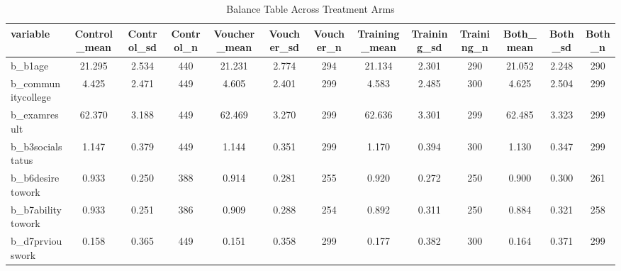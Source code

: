\begin{table}[htbp]
\centering
\caption{Balance Table Across Treatment Arms}
\label{tab:balance}
\begin{tabular}{lcccccccccccc}
\hline\hline
variable & Control\_mean & Control\_sd & Control\_n & Voucher\_mean & Voucher\_sd & Voucher\_n & Training\_mean & Training\_sd & Training\_n & Both\_mean & Both\_sd & Both\_n \\
\hline
b\_b1age & 21.295 & 2.534 & 440 & 21.231 & 2.774 & 294 & 21.134 & 2.301 & 290 & 21.052 & 2.248 & 290 \\
b\_communitycollege & 4.425 & 2.471 & 449 & 4.605 & 2.401 & 299 & 4.583 & 2.485 & 300 & 4.625 & 2.504 & 299 \\
b\_examresult & 62.370 & 3.188 & 449 & 62.469 & 3.270 & 299 & 62.636 & 3.301 & 299 & 62.485 & 3.323 & 299 \\
b\_b3socialstatus & 1.147 & 0.379 & 449 & 1.144 & 0.351 & 299 & 1.170 & 0.394 & 300 & 1.130 & 0.347 & 299 \\
b\_b6desiretowork & 0.933 & 0.250 & 388 & 0.914 & 0.281 & 255 & 0.920 & 0.272 & 250 & 0.900 & 0.300 & 261 \\
b\_b7abilitytowork & 0.933 & 0.251 & 386 & 0.909 & 0.288 & 254 & 0.892 & 0.311 & 250 & 0.884 & 0.321 & 258 \\
b\_d7prviouswork & 0.158 & 0.365 & 449 & 0.151 & 0.358 & 299 & 0.177 & 0.382 & 300 & 0.164 & 0.371 & 299 \\
\hline\hline
\end{tabular}
\end{table}